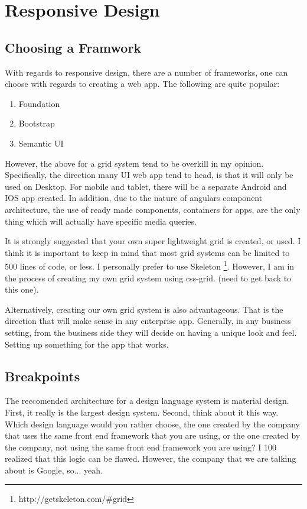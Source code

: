 \section{ Responsive Design }

\subsection{ Choosing a Framwork }
With regards to responsive design, there are a number of frameworks, one can
choose with regards to creating a web app. The following are quite popular:
\begin{enumerate}
  \item Foundation
  \item Bootstrap
  \item Semantic UI
\end{enumerate}

However, the above for a grid system tend to be overkill in my opinion.
Specifically, the direction many UI web app tend to head, is that it will only
be used on Desktop. For mobile and tablet, there will be a separate Android and
IOS app created. In addition, due to the nature of angulars component
architecture, the use of ready made components, containers for apps, are the
only thing which will actually have specific media queries.

It is strongly suggested that your own super lightweight grid is created, or
used. I think it is important to keep in mind that most grid systems can be
limited to 500 lines of code, or less. I personally prefer to use Skeleton
\footnote{http://getskeleton.com/\#grid}. However, I am in the process of
creating my own grid system using css-grid. (need to get back to this one).

Alternatively, creating our own grid system is also advantageous. That is the
direction that will make sense in any enterprise app. Generally, in any business
setting, from the business side they will decide on having a unique look and
feel. Setting up something for the app that works.

\subsection{ Breakpoints }
The reccomended architecture for a design language system is material design.
First, it really is the largest design system. Second, think about it this way.
Which design language would you rather choose, the one created by the company
that uses the same front end framework that you are using, or the one created
by the company, not using the same front end framework you are using? I 100%
realized that this logic can be flawed. However, the company that we are talking
about is Google, so... yeah.

